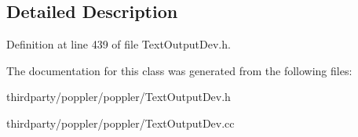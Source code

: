 \subsection{Detailed Description}


Definition at line 439 of file Text\+Output\+Dev.\+h.



The documentation for this class was generated from the following files\+:\begin{DoxyCompactItemize}
\item 
thirdparty/poppler/poppler/Text\+Output\+Dev.\+h\item 
thirdparty/poppler/poppler/Text\+Output\+Dev.\+cc\end{DoxyCompactItemize}
